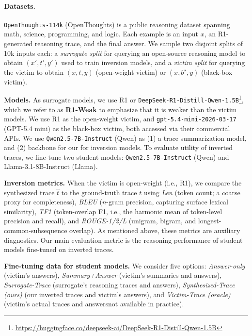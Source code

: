 \documentclass{article}
\begin{document}
\paragraph{Datasets.}
\texttt{OpenThoughts-114k} (OpenThoughts) is a public reasoning dataset spanning math, science, programming, and logic. Each example is an input $x$, an R1-generated reasoning trace, and the final answer.  We sample two disjoint splits of 10k inputs each: a \emph{surrogate split} for querying an open-source reasoning model to obtain $(x',t',y')$ used to train inversion models, and a \emph{victim split} for querying the victim to obtain $(x,t,y)$ (open-weight victim) or $(x,b^\star,y)$ (black-box victim).

\noindent
\textbf{Models.}
As surrogate models, we
use R1 or \texttt{DeepSeek-R1-Distill-Qwen-1.5B}\footnote{\url{https://huggingface.co/deepseek-ai/DeepSeek-R1-Distill-Qwen-1.5B}}, which we refer to as \textbf{R1-Weak} to emphasize that it is weaker than the victim models. We use R1 as the open-weight victim, and \texttt{gpt-5.4-mini-2026-03-17} (GPT-5.4 mini) as the black-box victim, both accessed via their commercial APIs.
We use \texttt{Qwen2.5-7B-Instruct} (Qwen) as (1) a trace summarization model, and (2) backbone for our for inversion models.  To evaluate utility of inverted traces, we fine-tune two student models: \texttt{Qwen2.5-7B-Instruct} (Qwen) and Llama-3.1-8B-Instruct (Llama).

\noindent
\textbf{Inversion metrics.}
When the victim is open-weight (i.e., R1), we compare the synthesized trace $\hat{t}$ to the ground-truth trace $t$ using \emph{Len} (token count; a coarse proxy for completeness), \emph{BLEU} ($n$-gram precision, capturing surface lexical similarity), \emph{TF1} (token-overlap F1, i.e., the harmonic mean of token-level precision and recall), and \emph{ROUGE-1/2/L} (unigram, bigram, and longest-common-subsequence overlap). As mentioned above, these metrics are auxiliary diagnostics. Our main evaluation metric is the reasoning performance of student models fine-tuned on inverted traces.

\noindent
\textbf{Fine-tuning data for student models.}
We consider five options: \emph{Answer-only} (victim's answers), \emph{Summary+Answer} (victim's summaries and answers), \emph{Surrogate-Trace} (surrogate's reasoning traces and answers), \emph{Synthesized-Trace (ours)} (our inverted traces and victim's answers), and \emph{Victim-Trace (oracle)} (victim's actual traces and answers\textemdash not available in practice).
\end{document}

